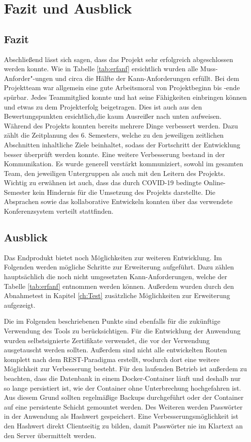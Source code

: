 \chapter{Fazit und Ausblick}
\section{Fazit}
Abschließend lässt sich sagen, dass das Projekt sehr erfolgreich abgeschlossen werden konnte. 
Wie in Tabelle \vref{tab:erfanf} ersichtlich wurden alle Muss-Anforder"-ungen und circa die Hälfte der Kann-Anforderungen erfüllt.
Bei dem Projektteam war allgemein eine gute Arbeitsmoral von Projektbeginn bis -ende spürbar.
Jedes Teammitglied konnte und hat seine Fähigkeiten einbringen können und etwas zu dem Projekterfolg beigetragen.
Dies ist auch aus den Bewertungspunkten ersichtlich,die kaum Ausreißer nach unten aufweisen.
Während des Projekts konnten bereits mehrere Dinge verbessert werden. 
Dazu zählt die Zeitplanung des 6. Semesters, welche zu den jeweiligen zeitlichen Abschnitten inhaltliche Ziele beinhaltet, sodass der Fortschritt der Entwicklung besser überprüft werden konnte.
Eine weitere Verbesserung bestand in der Kommunikation.
Es wurde generell verstärkt kommuniziert, sowohl im gesamten Team, den jeweiligen Untergruppen als auch mit den Leitern des Projekts. 
Wichtig zu erwähnen ist auch, dass das durch COVID-19 bedingte Online-Semester kein Hindernis für die Umsetzung des Projekts darstellte.
Die Absprachen sowie das kollaborative Entwickeln konnten über das verwendete Konferenzsystem verteilt stattfinden.

\section{Ausblick}
Das Endprodukt bietet noch Möglichkeiten zur weiteren Entwicklung. 
Im Folgenden werden mögliche Schritte zur Erweiterung aufgeführt.
Dazu zählen hauptsächlich die noch nicht umgesetzten Kann-Anforderungen, welche der Tabelle \vref{tab:erfanf} entnommen werden können.
Außerdem wurden durch den Abnahmetest in Kapitel \vref{ch:Test} zusätzliche Möglichkeiten zur Erweiterung aufgezeigt.

Die im Folgenden beschriebenen Punkte sind ebenfalls für die zukünftige Verwendung des Tools zu berücksichtigen.
Für die Entwicklung der Anwendung wurden selbstsignierte Zertifikate verwendet, die vor der Verwendung ausgetauscht werden sollten.
Außerdem sind nicht alle entwickelten Routen komplett nach dem \ac{REST}-Paradigma erstellt, wodurch dort eine weitere Möglichkeit zur Verbesserung besteht.
Für den laufenden Betrieb ist außerdem zu beachten, dass die Datenbank in einem Docker-Container läuft und deshalb nur so lange persistiert ist, wie der Container ohne Unterbrechung hochgefahren ist.
Aus diesem Grund sollten regelmäßige Backups durchgeführt oder der Container auf eine persistente Schicht gemountet werden. 
Des Weiteren werden Passwörter in der Anwendung als Hashwert gespeichert.
Eine Verbesserungsmöglichkeit ist den Hashwert direkt Clientseitig zu bilden, damit Passwörter nie im Klartext an den Server übermittelt werden.